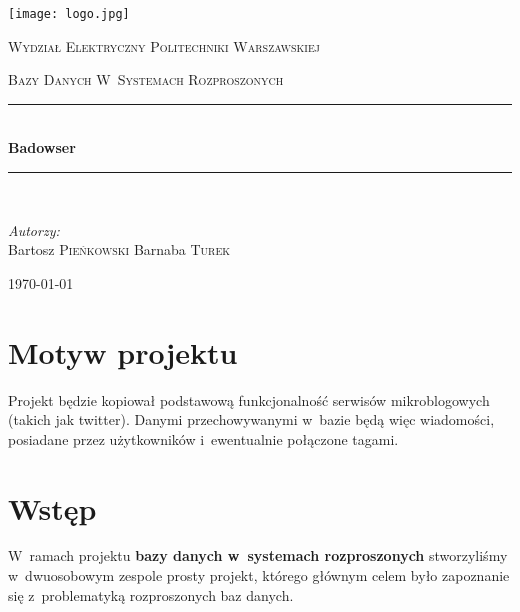 \documentclass[a4paper]{article}
\newcommand{\HRule}{\rule{\linewidth}{0.5mm}}
\begin{document}
\begin{titlepage}
  
  \begin{center}
    
    
    \texttt{[image: logo.jpg]}\\[1cm]    
    
    \begin{onehalfspace}
    \textsc{\LARGE Wydział Elektryczny Politechniki Warszawskiej}\\[1.5cm]
    \end{onehalfspace}
    

    
    \textsc{\Large Bazy Danych W~Systemach Rozproszonych}\\[0.5cm]
    
    
    \HRule \\[0.4cm]
    { \huge \bfseries Badowser}\\[0.2cm]
    \HRule \\[1.5cm]
    
    \begin{minipage}{0.4\textwidth}
      \begin{flushleft} \large
        \emph{Autorzy:}\\
        Bartosz \textsc{Pieńkowski}
        Barnaba \textsc{Turek}
      \end{flushleft}
    \end{minipage}
    \vfill
    
    {\large \today}
    
  \end{center}
  
\end{titlepage}
\sloppy

\section{Motyw projektu}
Projekt będzie kopiował podstawową funkcjonalność serwisów mikroblogowych (takich jak twitter).
Danymi przechowywanymi w~bazie będą więc wiadomości, posiadane przez użytkowników i~ewentualnie połączone tagami.

\section{Wstęp}
W~ramach projektu \textbf{bazy danych w~systemach rozproszonych} stworzyliśmy w~dwuosobowym zespole prosty projekt,
którego głównym celem było zapoznanie się z~problematyką rozproszonych baz danych.
\end{document}
